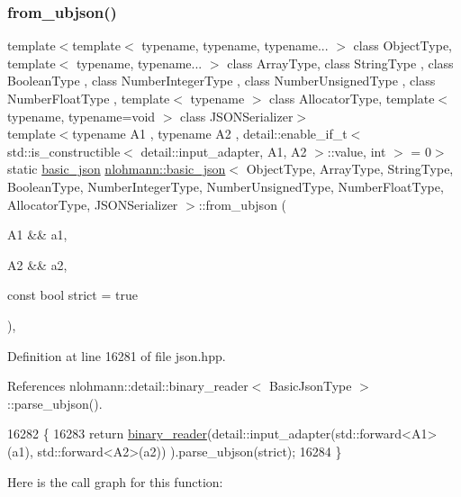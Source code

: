 \subsubsection{\texorpdfstring{from\+\_\+ubjson()}{from\_ubjson()}\hspace{0.1cm}{\footnotesize\ttfamily [2/2]}}
{\footnotesize\ttfamily template$<$template$<$ typename, typename, typename... $>$ class Object\+Type, template$<$ typename, typename... $>$ class Array\+Type, class String\+Type , class Boolean\+Type , class Number\+Integer\+Type , class Number\+Unsigned\+Type , class Number\+Float\+Type , template$<$ typename $>$ class Allocator\+Type, template$<$ typename, typename=void $>$ class J\+S\+O\+N\+Serializer$>$ \\
template$<$typename A1 , typename A2 , detail\+::enable\+\_\+if\+\_\+t$<$ std\+::is\+\_\+constructible$<$ detail\+::input\+\_\+adapter, A1, A2 $>$\+::value, int $>$  = 0$>$ \\
static \hyperlink{classnlohmann_1_1basic__json}{basic\+\_\+json} \hyperlink{classnlohmann_1_1basic__json}{nlohmann\+::basic\+\_\+json}$<$ Object\+Type, Array\+Type, String\+Type, Boolean\+Type, Number\+Integer\+Type, Number\+Unsigned\+Type, Number\+Float\+Type, Allocator\+Type, J\+S\+O\+N\+Serializer $>$\+::from\+\_\+ubjson (\begin{DoxyParamCaption}\item[{A1 \&\&}]{a1,  }\item[{A2 \&\&}]{a2,  }\item[{const bool}]{strict = {\ttfamily true} }\end{DoxyParamCaption})\hspace{0.3cm}{\ttfamily [inline]}, {\ttfamily [static]}}



Definition at line 16281 of file json.\+hpp.



References nlohmann\+::detail\+::binary\+\_\+reader$<$ Basic\+Json\+Type $>$\+::parse\+\_\+ubjson().


\begin{DoxyCode}
16282     \{
16283         \textcolor{keywordflow}{return} \hyperlink{classnlohmann_1_1basic__json_a7e06ed27ff517575ccb23fc23fca2b8f}{binary\_reader}(detail::input\_adapter(std::forward<A1>(a1), std::forward<A2>(a2))
      ).parse\_ubjson(strict);
16284     \}
\end{DoxyCode}
Here is the call graph for this function\+:
\mbox{\label{classnlohmann_1_1basic__json_a3acba9c6ceb7214e565fe08c3ba5b352}} 
